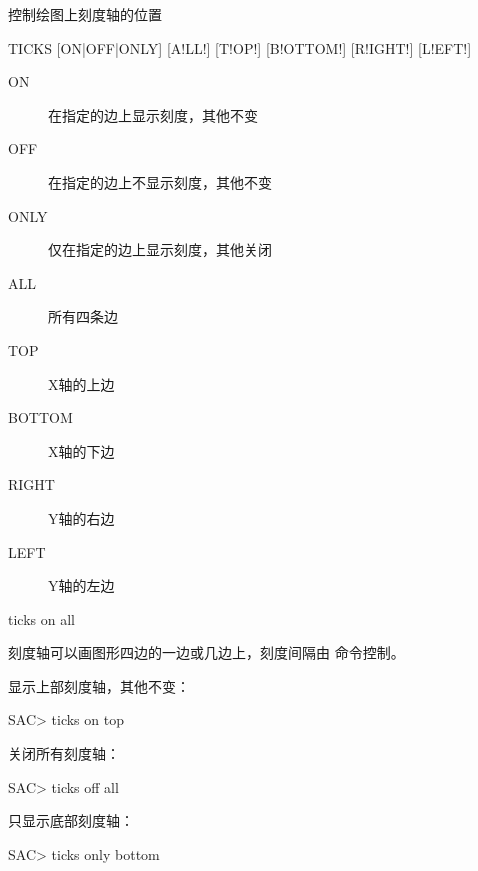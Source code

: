 \label{cmd:ticks}

控制绘图上刻度轴的位置

\begin{SACSTX}
TICKS [ON|OFF|ONLY] [A!LL!] [T!OP!] [B!OTTOM!] [R!IGHT!] [L!EFT!]
\end{SACSTX}

\begin{description}
\item [ON] 在指定的边上显示刻度，其他不变
\item [OFF] 在指定的边上不显示刻度，其他不变
\item [ONLY] 仅在指定的边上显示刻度，其他关闭
\item [ALL] 所有四条边
\item [TOP] X轴的上边
\item [BOTTOM] X轴的下边
\item [RIGHT] Y轴的右边
\item [LEFT] Y轴的左边
\end{description}

\begin{SACDFT}
ticks on all
\end{SACDFT}

刻度轴可以画图形四边的一边或几边上，刻度间隔由  命令控制。

显示上部刻度轴，其他不变：
\begin{SACCode}
SAC> ticks on top
\end{SACCode}

关闭所有刻度轴：
\begin{SACCode}
SAC> ticks off all
\end{SACCode}

只显示底部刻度轴：
\begin{SACCode}
SAC> ticks only bottom
\end{SACCode}
